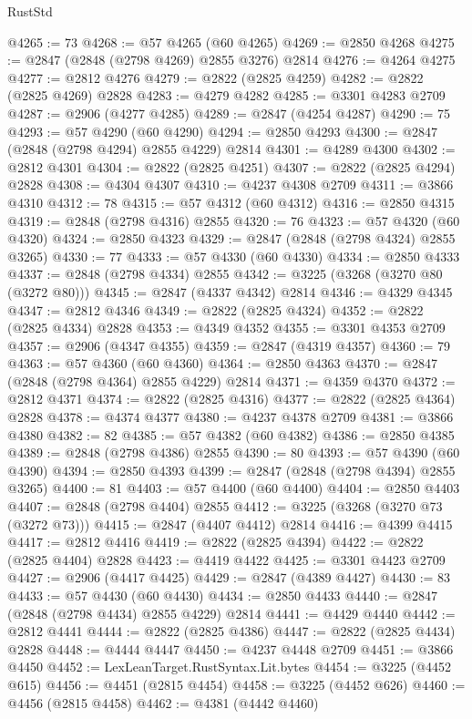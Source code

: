 \begin{lexlean}{RustStd}
\begin{coremodule}
@4265 := 73
@4268 := @57 @4265 (@60 @4265)
@4269 := @2850 @4268
@4275 := @2847 (@2848 (@2798 @4269) @2855 @3276) @2814
@4276 := @4264 @4275
@4277 := @2812 @4276
@4279 := @2822 (@2825 @4259)
@4282 := @2822 (@2825 @4269) @2828
@4283 := @4279 @4282
@4285 := @3301 @4283 @2709
@4287 := @2906 (@4277 @4285)
@4289 := @2847 (@4254 @4287)
@4290 := 75
@4293 := @57 @4290 (@60 @4290)
@4294 := @2850 @4293
@4300 := @2847 (@2848 (@2798 @4294) @2855 @4229) @2814
@4301 := @4289 @4300
@4302 := @2812 @4301
@4304 := @2822 (@2825 @4251)
@4307 := @2822 (@2825 @4294) @2828
@4308 := @4304 @4307
@4310 := @4237 @4308 @2709
@4311 := @3866 @4310
@4312 := 78
@4315 := @57 @4312 (@60 @4312)
@4316 := @2850 @4315
@4319 := @2848 (@2798 @4316) @2855
@4320 := 76
@4323 := @57 @4320 (@60 @4320)
@4324 := @2850 @4323
@4329 := @2847 (@2848 (@2798 @4324) @2855 @3265)
@4330 := 77
@4333 := @57 @4330 (@60 @4330)
@4334 := @2850 @4333
@4337 := @2848 (@2798 @4334) @2855
@4342 := @3225 (@3268 (@3270 @80 (@3272 @80)))
@4345 := @2847 (@4337 @4342) @2814
@4346 := @4329 @4345
@4347 := @2812 @4346
@4349 := @2822 (@2825 @4324)
@4352 := @2822 (@2825 @4334) @2828
@4353 := @4349 @4352
@4355 := @3301 @4353 @2709
@4357 := @2906 (@4347 @4355)
@4359 := @2847 (@4319 @4357)
@4360 := 79
@4363 := @57 @4360 (@60 @4360)
@4364 := @2850 @4363
@4370 := @2847 (@2848 (@2798 @4364) @2855 @4229) @2814
@4371 := @4359 @4370
@4372 := @2812 @4371
@4374 := @2822 (@2825 @4316)
@4377 := @2822 (@2825 @4364) @2828
@4378 := @4374 @4377
@4380 := @4237 @4378 @2709
@4381 := @3866 @4380
@4382 := 82
@4385 := @57 @4382 (@60 @4382)
@4386 := @2850 @4385
@4389 := @2848 (@2798 @4386) @2855
@4390 := 80
@4393 := @57 @4390 (@60 @4390)
@4394 := @2850 @4393
@4399 := @2847 (@2848 (@2798 @4394) @2855 @3265)
@4400 := 81
@4403 := @57 @4400 (@60 @4400)
@4404 := @2850 @4403
@4407 := @2848 (@2798 @4404) @2855
@4412 := @3225 (@3268 (@3270 @73 (@3272 @73)))
@4415 := @2847 (@4407 @4412) @2814
@4416 := @4399 @4415
@4417 := @2812 @4416
@4419 := @2822 (@2825 @4394)
@4422 := @2822 (@2825 @4404) @2828
@4423 := @4419 @4422
@4425 := @3301 @4423 @2709
@4427 := @2906 (@4417 @4425)
@4429 := @2847 (@4389 @4427)
@4430 := 83
@4433 := @57 @4430 (@60 @4430)
@4434 := @2850 @4433
@4440 := @2847 (@2848 (@2798 @4434) @2855 @4229) @2814
@4441 := @4429 @4440
@4442 := @2812 @4441
@4444 := @2822 (@2825 @4386)
@4447 := @2822 (@2825 @4434) @2828
@4448 := @4444 @4447
@4450 := @4237 @4448 @2709
@4451 := @3866 @4450
@4452 := LexLeanTarget.RustSyntax.Lit.bytes
@4454 := @3225 (@4452 @615)
@4456 := @4451 (@2815 @4454)
@4458 := @3225 (@4452 @626)
@4460 := @4456 (@2815 @4458)
@4462 := @4381 (@4442 @4460)

\end{coremodule}
\end{lexlean}
